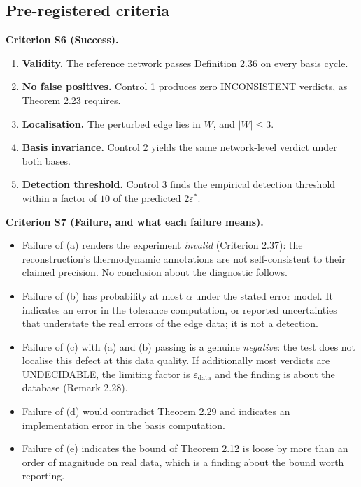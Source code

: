 \documentclass[11pt,a4paper]{article}
\theoremstyle{definition}
\theoremstyle{remark}
\newcommand{\abs}[1]{\lvert#1\rvert}
\newcommand{\eps}{\varepsilon}
\newcommand{\epsdata}{\eps_{\mathrm{data}}}
\newcommand{\epsstar}{\eps^{\ast}}
\begin{document}
\subsection*{Pre-registered criteria}

\par\noindent\textbf{Criterion S6 (Success).}\label{crit:success} 
\leavevmode
\begin{enumerate}[label=(\alph*),leftmargin=2em,itemsep=2pt]
\item \textbf{Validity.} The reference network passes
Definition 2.36 on every basis cycle.
\item \textbf{No false positives.} Control 1 produces zero
\textsf{INCONSISTENT} verdicts, as Theorem 2.23
requires.
\item \textbf{Localisation.} The perturbed edge lies in $W$, and
$\abs{W}\le 3$.
\item \textbf{Basis invariance.} Control 2 yields the same network-level
verdict under both bases.
\item \textbf{Detection threshold.} Control 3 finds the empirical
detection threshold within a factor of $10$ of the predicted
$2\epsstar$.
\end{enumerate}
\par

\par\noindent\textbf{Criterion S7 (Failure, and what each failure means).}\label{crit:failure} 
\leavevmode
\begin{itemize}[leftmargin=1.5em,itemsep=2pt]
\item Failure of (a) renders the experiment \emph{invalid}
(Criterion 2.37): the reconstruction's thermodynamic annotations
are not self-consistent to their claimed precision. No conclusion about
the diagnostic follows.
\item Failure of (b) has probability at most $\alpha$ under the stated
error model. It indicates an error in the tolerance computation, or
reported uncertainties that understate the real errors of the edge
data; it is not a detection.
\item Failure of (c) with (a) and (b) passing is a genuine
\emph{negative}: the test does not localise this defect at this data
quality. If additionally most verdicts are \textsf{UNDECIDABLE}, the
limiting factor is $\epsdata$ and the finding is about the database
(Remark 2.28).
\item Failure of (d) would contradict Theorem 2.29 and
indicates an implementation error in the basis computation.
\item Failure of (e) indicates the bound of Theorem 2.12 is
loose by more than an order of magnitude on real data, which is a
finding about the bound worth reporting.
\end{itemize}
\par
\end{document}
